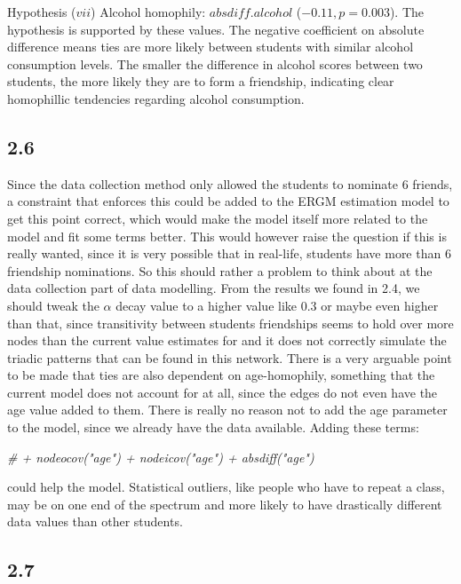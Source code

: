 \documentclass[
]{article}
\newenvironment{Shaded}{\begin{snugshade}}{\end{snugshade}}
\newcommand{\CommentTok}[1]{\textcolor[rgb]{0.56,0.35,0.01}{\textit{#1}}}
\begin{document}
Hypothesis (\(vii\)) Alcohol homophily: \(absdiff.alcohol\)
(\(−0.11, p = 0.003\)). The hypothesis is supported by these values. The
negative coefficient on absolute difference means ties are more likely
between students with similar alcohol consumption levels. The smaller
the difference in alcohol scores between two students, the more likely
they are to form a friendship, indicating clear homophillic tendencies
regarding alcohol consumption.

\subsection{2.6}\label{section-7}

Since the data collection method only allowed the students to nominate 6
friends, a constraint that enforces this could be added to the ERGM
estimation model to get this point correct, which would make the model
itself more related to the model and fit some terms better. This would
however raise the question if this is really wanted, since it is very
possible that in real-life, students have more than 6 friendship
nominations. So this should rather a problem to think about at the data
collection part of data modelling. From the results we found in 2.4, we
should tweak the \(\alpha\) decay value to a higher value like 0.3 or
maybe even higher than that, since transitivity between students
friendships seems to hold over more nodes than the current value
estimates for and it does not correctly simulate the triadic patterns
that can be found in this network. There is a very arguable point to be
made that ties are also dependent on age-homophily, something that the
current model does not account for at all, since the edges do not even
have the age value added to them. There is really no reason not to add
the age parameter to the model, since we already have the data
available. Adding these terms:

\begin{Shaded}
\begin{Highlighting}[]
\CommentTok{\# + nodeocov("age") + nodeicov("age") + absdiff("age")}
\end{Highlighting}
\end{Shaded}

could help the model. Statistical outliers, like people who have to
repeat a class, may be on one end of the spectrum and more likely to
have drastically different data values than other students.

\subsection{2.7}\label{section-8}
\end{document}
